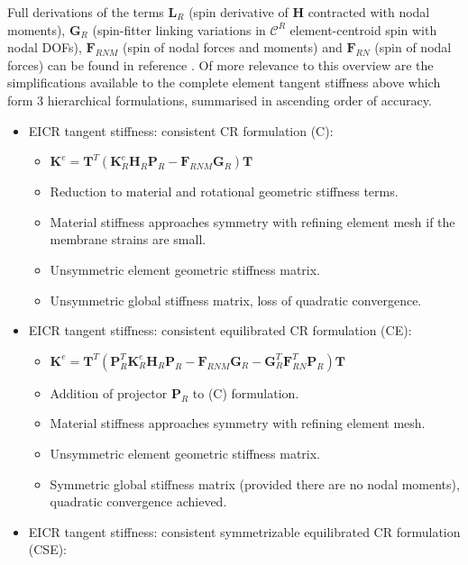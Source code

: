  Full derivations of the terms $\mathbf{L}_R$ (spin derivative of $\mathbf{H}$ contracted with nodal moments), $\mathbf{G}_R$ (spin-fitter linking variations in $\mathscr{C}^R$ element-centroid spin with nodal DOFs), $\mathbf{F}_{RNM}$ (spin of nodal forces and moments) and $\mathbf{F}_{RN}$ (spin of nodal forces) can be found in reference \cite{felippa2005unified}. Of more relevance to this overview are the simplifications available to the complete element tangent stiffness above which form 3 hierarchical formulations, summarised in ascending order of accuracy.
 
  \begin{itemize}
 	\item EICR tangent stiffness: consistent CR formulation (C):
 	\begin{itemize}
 		\item $\mathbf{K}^e 
 		=
 		\mathbf{T}^T
 		(
 		\mathbf{K}_R^e
 		\mathbf{H}_R
 		\mathbf{P}_R
 		-
 		\mathbf{F}_{RNM}
 		\mathbf{G}_R
 		)
 		\mathbf{T}$
		\item Reduction to material and rotational geometric stiffness terms.
		\item Material stiffness approaches symmetry with refining element mesh if the membrane strains are small.
 		\item Unsymmetric element geometric stiffness matrix.
 		\item Unsymmetric global stiffness matrix, loss of quadratic convergence.
 	\end{itemize}
 	\item EICR tangent stiffness: consistent equilibrated CR formulation (CE):
 	\begin{itemize}
 		\item $\mathbf{K}^e 
 		=
 		\mathbf{T}^T
 		(
 		\mathbf{P}_R^T
 		\mathbf{K}_R^e
 		\mathbf{H}_R
 		\mathbf{P}_R
 		-
 		\mathbf{F}_{RNM}
 		\mathbf{G}_R
 		-
 		\mathbf{G}_R^T
 		\mathbf{F}_{RN}^T
 		\mathbf{P}_R
 		)
 		\mathbf{T}$
 		\item Addition of projector $\mathbf{P}_R$ to (C) formulation.
 		\item Material stiffness approaches symmetry with refining element mesh.
 		\item Unsymmetric element geometric stiffness matrix.
 		\item Symmetric global stiffness matrix (provided there are no nodal moments), quadratic convergence achieved.
 	\end{itemize}
 	\item EICR tangent stiffness: consistent symmetrizable equilibrated CR formulation (CSE):

\end{itemize}
